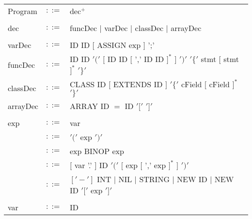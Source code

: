 \documentclass{article}
\begin{document}
\begin{table}[h]
\centering
\begin{tabular}{ l c l }
Program  & $::=$ & dec$^{+}$ \\
\\
dec      & $::=$ & funcDec $|$ varDec $|$ classDec $|$ arrayDec \\
\\
varDec   & $::=$ & ID ID $[$ ASSIGN exp $]$ ';' \\
funcDec  & $::=$ & ID ID $'('$ $[$ ID ID $[$ ',' ID ID $]^{*}$ $]$ $')'$ %
                   $'\{'$ stmt   $[$ stmt $]^{*}$ $'\}'$                 \\
classDec & $::=$ & CLASS ID $[$ EXTENDS ID $]$ $'\{'$ cField $[$ cField $]^{*}$ $'\}'$ \\
arrayDec & $::=$ & ARRAY ID $=$ ID $'['$ $']'$ \\
\\
exp      & $::=$ & var                                                            \\
         & $::=$ & $'('$ exp $')'$                                                \\
         & $::=$ & exp BINOP exp                                                  \\
         & $::=$ & $[$ var '.' $]$ ID $'('$ $[$ exp $[$ ',' exp $]^{*}$ $]$ $')'$ \\
         & $::=$ & $['-']$ INT $|$ NIL $|$ STRING $|$ NEW ID $|$ NEW ID $'['$ exp $']'$ \\
\\
var      & $::=$ & ID                  \\

\end{tabular}
\end{table}
\end{document}
